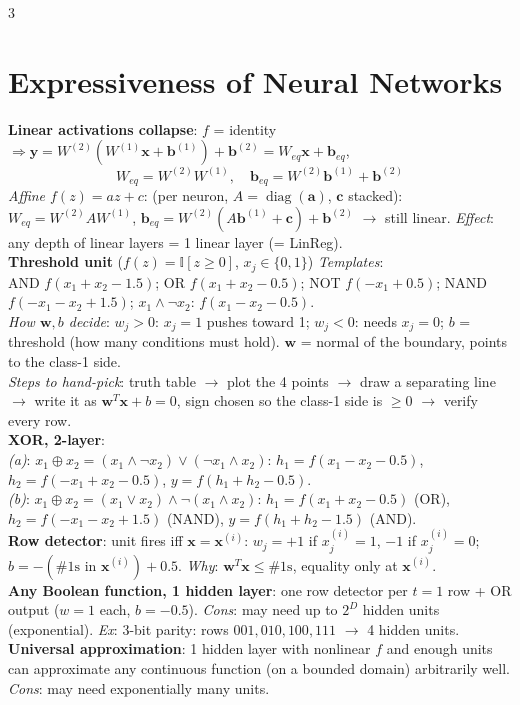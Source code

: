 \documentclass[10pt]{article}
\newcommand{\ind}{\mathbb{I}}
\newcommand{\vx}{\mathbf{x}}
\newcommand{\vw}{\mathbf{w}}
\newcommand{\sub}[1]{\textit{#1}:}  %
\newcommand{\vb}{\mathbf{b}}
\newcommand{\vy}{\mathbf{y}}
\begin{document}
\begin{multicols*}{3}
\section{Expressiveness of Neural Networks}
\textbf{Linear activations collapse}: $f$ = identity $\Rightarrow\vy=W^{(2)}(W^{(1)}\vx+\vb^{(1)})+\vb^{(2)}=W_{eq}\vx+\vb_{eq}$,
\[ W_{eq}=W^{(2)}W^{(1)},\quad \vb_{eq}=W^{(2)}\vb^{(1)}+\vb^{(2)} \]
\sub{Affine $f(z)=az+c$} (per neuron, $A=\operatorname{diag}(\mathbf a)$, $\mathbf c$ stacked): $W_{eq}=W^{(2)}AW^{(1)}$, $\vb_{eq}=W^{(2)}(A\vb^{(1)}+\mathbf c)+\vb^{(2)}$ $\to$ still linear. \sub{Effect} any depth of linear layers = 1 linear layer (= LinReg).\\
\textbf{Threshold unit} ($f(z)=\ind[z\ge0]$, $x_j\in\{0,1\}$) \sub{Templates}\\
AND $f(x_1\!+\!x_2\!-\!1.5)$; OR $f(x_1\!+\!x_2\!-\!0.5)$; NOT $f(-x_1\!+\!0.5)$; NAND $f(-x_1\!-\!x_2\!+\!1.5)$; $x_1\wedge\neg x_2$: $f(x_1\!-\!x_2\!-\!0.5)$.\\
\sub{How $\vw,b$ decide} $w_j>0$: $x_j=1$ pushes toward 1; $w_j<0$: needs $x_j=0$; $b$ = threshold (how many conditions must hold). $\vw$ = normal of the boundary, points to the class-1 side.\\
\sub{Steps to hand-pick} truth table $\to$ plot the 4 points $\to$ draw a separating line $\to$ write it as $\vw^T\vx+b=0$, sign chosen so the class-1 side is $\ge0$ $\to$ verify every row.\\
\textbf{XOR, 2-layer}:\\
\sub{(a)} $x_1\oplus x_2=(x_1\wedge\neg x_2)\vee(\neg x_1\wedge x_2)$: $h_1=f(x_1-x_2-0.5)$, $h_2=f(-x_1+x_2-0.5)$, $y=f(h_1+h_2-0.5)$.\\
\sub{(b)} $x_1\oplus x_2=(x_1\vee x_2)\wedge\neg(x_1\wedge x_2)$: $h_1=f(x_1+x_2-0.5)$ (OR), $h_2=f(-x_1-x_2+1.5)$ (NAND), $y=f(h_1+h_2-1.5)$ (AND).\\
\textbf{Row detector}: unit fires iff $\vx=\vx^{(i)}$: $w_j=+1$ if $x^{(i)}_j=1$, $-1$ if $x^{(i)}_j=0$; $b=-(\#\text{1s in }\vx^{(i)})+0.5$. \sub{Why} $\vw^T\vx\le\#\text{1s}$, equality only at $\vx^{(i)}$.\\
\textbf{Any Boolean function, 1 hidden layer}: one row detector per $t=1$ row + OR output ($w=1$ each, $b=-0.5$). \sub{Cons} may need up to $2^D$ hidden units (exponential). \sub{Ex} 3-bit parity: rows $001,010,100,111$ $\to$ 4 hidden units.\\
\textbf{Universal approximation}: 1 hidden layer with nonlinear $f$ and enough units can approximate any continuous function (on a bounded domain) arbitrarily well. \sub{Cons} may need exponentially many units.



\end{multicols*}
\end{document}
